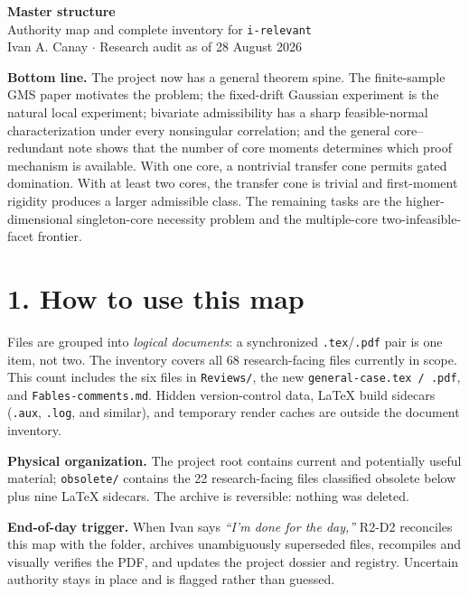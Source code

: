 \documentclass[10pt]{article}
\newcommand{\fname}[1]{{\footnotesize\nolinkurl{#1}}}
\begin{document}
\begin{center}
  {\LARGE\sffamily\bfseries\color{navy} Master structure}\\[3pt]
  {\large\sffamily Authority map and complete inventory for \texttt{i-relevant}}\\[7pt]
  {\small Ivan A. Canay \enspace $\cdot$ \enspace Research audit as of 28 August 2026}
\end{center}

\vspace{2pt}
\noindent\colorbox{softblue}{\parbox{0.965\textwidth}{
\textbf{Bottom line.}  The project now has a general theorem spine.  The finite-sample GMS paper motivates the problem; the fixed-drift Gaussian experiment is the natural local experiment; bivariate admissibility has a sharp feasible-normal characterization under every nonsingular correlation; and the general core--redundant note shows that the number of core moments determines which proof mechanism is available.  With one core, a nontrivial transfer cone permits gated domination.  With at least two cores, the transfer cone is trivial and first-moment rigidity produces a larger admissible class.  The remaining tasks are the higher-dimensional singleton-core necessity problem and the multiple-core two-infeasible-facet frontier.
}}

\section*{1. How to use this map}

Files are grouped into \emph{logical documents}: a synchronized \texttt{.tex}/\texttt{.pdf} pair is one item, not two.  The inventory covers all 68 research-facing files currently in scope.  This count includes the six files in \fname{Reviews/}, the new \fname{general-case.tex / .pdf}, and \fname{Fables-comments.md}.  Hidden version-control data, LaTeX build sidecars (\texttt{.aux}, \texttt{.log}, and similar), and temporary render caches are outside the document inventory.

\textbf{Physical organization.}  The project root contains current and potentially useful material; \fname{obsolete/} contains the 22 research-facing files classified obsolete below plus nine LaTeX sidecars.  The archive is reversible: nothing was deleted.

\textbf{End-of-day trigger.}  When Ivan says \emph{``I'm done for the day,''} R2-D2 reconciles this map with the folder, archives unambiguously superseded files, recompiles and visually verifies the PDF, and updates the project dossier and registry.  Uncertain authority stays in place and is flagged rather than guessed.
\end{document}
